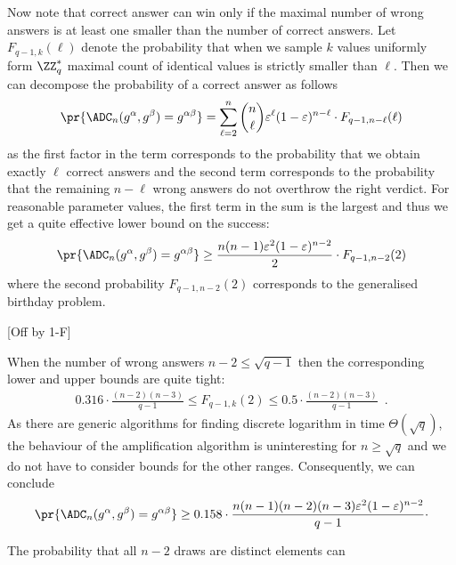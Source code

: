 \documentclass{crypto-exercise}
\begin{document}
\begin{solution}
Now note that correct answer can win only if the maximal number of wrong answers is at least one smaller than the number of correct answers. Let $F_{q-1,k}(\ell)$ denote the probability that when we sample $k$ values uniformly form $\ZZ_q^*$ maximal count of identical values is strictly smaller than $\ell$. Then we can decompose the probability of a correct answer as follows
\begin{align*}
\pr{\ADC_n(g^\alpha,g^\beta)=g^{\alpha\beta}}=
\sum_{\ell=2}^n\binom{n}{\ell}\varepsilon^\ell(1-\varepsilon)^{n-\ell}\cdot
F_{q-1,n-\ell}(\ell)
\end{align*}
as the first factor in the term corresponds to the probability that we obtain exactly $\ell$ correct answers and the second term corresponds to the probability that the remaining $n-\ell$ wrong answers do not overthrow the right verdict. For reasonable parameter values, the first term in the sum is the largest and thus we get a quite effective lower bound on the success:
\begin{align*}
\pr{\ADC_n(g^\alpha,g^\beta)=g^{\alpha\beta}}\geq
\frac{n(n-1)\varepsilon^2(1-\varepsilon)^{n-2}}{2}\cdot
F_{q-1,n-2}(2)
\end{align*} 
where the second probability $F_{q-1,n-2}(2)$ corresponds to the generalised birthday problem.

[Off by 1-F]

When the number of wrong answers $n-2\leq \sqrt{q-1}$ then the corresponding lower and upper bounds are quite tight: 
\begin{align*}
0.316\cdot
  \frac{(n-2)(n-3)}{q-1}\leq F_{q-1,k}(2)\leq 0.5\cdot
  \frac{(n-2)(n-3)}{q-1}\enspace.
\end{align*}
As there are generic algorithms for finding discrete logarithm in time $\Theta(\sqrt{q})$, the behaviour of the amplification algorithm is uninteresting for $n\geq \sqrt{q}$ and we do not have to consider bounds for the other ranges. 
Consequently, we can conclude
\begin{align*}
\pr{\ADC_n(g^\alpha,g^\beta)=g^{\alpha\beta}}\geq
0.158\cdot\frac{n(n-1)(n-2)(n-3)\varepsilon^2(1-\varepsilon)^{n-2}}{q-1}\cdot
\end{align*} 


  
 
The probability that all $n-2$ draws are distinct elements can  



\end{solution}
\end{document}
